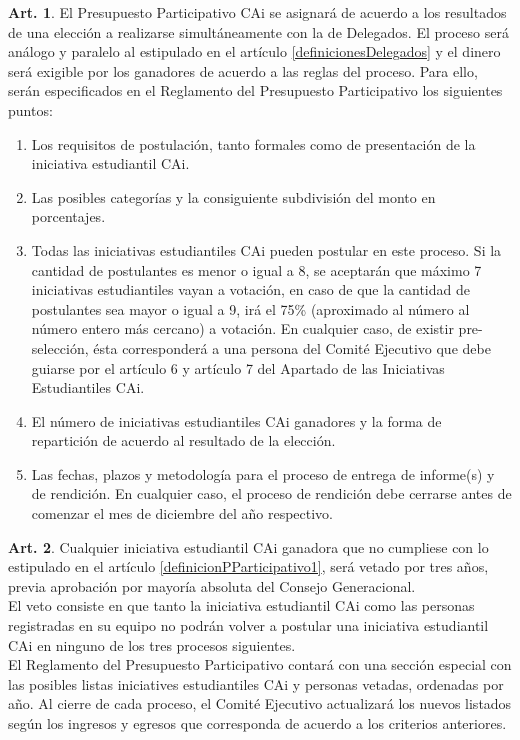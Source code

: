 \documentclass[letterpaper,11pt]{article}
\theoremstyle{definition}%
\newtheorem{art}{Art.} %
\newcommand{\aref}[1]{\hyperref[#1]{\ref*{#1}}}
\begin{document}
\begin{art}\label{definicionPParticipativo2}
	El Presupuesto Participativo CAi se asignará de acuerdo a los resultados de una elección a realizarse simultáneamente con la de Delegados. El proceso será análogo y paralelo al estipulado en el artículo \aref{definicionesDelegados} y el dinero será exigible por los ganadores de acuerdo a las reglas del proceso. Para ello, serán especificados en el Reglamento del Presupuesto Participativo los siguientes puntos:
	\begin{enumerate}
		\item Los requisitos de postulación, tanto formales como de presentación de la iniciativa estudiantil CAi.
		\item Las posibles categorías y la consiguiente subdivisión del monto en porcentajes.
		\item Todas las iniciativas estudiantiles CAi pueden postular en este proceso. Si la cantidad de postulantes es menor o igual a 8, se aceptarán que máximo 7 iniciativas estudiantiles vayan a votación, en caso de que la cantidad de postulantes sea mayor o igual a 9, irá el 75\% (aproximado al número al número entero más cercano) a votación. En cualquier caso, de existir pre-selección, ésta corresponderá a una persona del Comité Ejecutivo que debe guiarse por el artículo 6 y artículo 7 del Apartado de las Iniciativas Estudiantiles CAi.
		\item El número de iniciativas estudiantiles CAi ganadores y la forma de repartición de acuerdo al resultado de la elección.
		\item Las fechas, plazos y metodología para el proceso de entrega de informe(s) y de rendición. En cualquier caso, el proceso de rendición debe cerrarse antes de comenzar el mes de diciembre del año respectivo.
	\end{enumerate}
\end{art}

\begin{art}\label{sancionesPParticipativo}
	Cualquier iniciativa estudiantil CAi ganadora que no cumpliese con lo estipulado en el artículo \aref{definicionPParticipativo1}, será vetado por tres años, previa aprobación por mayoría absoluta del Consejo Generacional.
	\\
	El veto consiste en que tanto la iniciativa estudiantil CAi como las personas registradas en su equipo no podrán volver a postular una iniciativa estudiantil CAi en ninguno de los tres procesos siguientes.
	\\
	El Reglamento del Presupuesto Participativo contará con una sección especial con las posibles listas iniciatives estudiantiles CAi y personas vetadas, ordenadas por año. Al cierre de cada proceso, el Comité Ejecutivo actualizará los nuevos listados según los ingresos y egresos que corresponda de acuerdo a los criterios anteriores.
\end{art}
\end{document}

